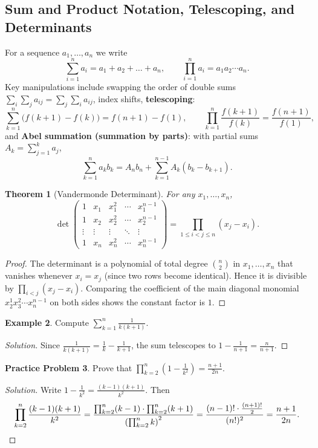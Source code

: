 \documentclass[11pt]{article}
\theoremstyle{plain}
\newtheorem{theorem}{Theorem}[section]
\theoremstyle{definition}
\newtheorem{example}[theorem]{Example}
\newtheorem{problem}[theorem]{Practice Problem}
\newenvironment{solution}{\begin{proof}[Solution]}{\end{proof}}
\begin{document}
\subsection{Sum and Product Notation, Telescoping, and Determinants}
For a sequence $a_1,\dots,a_n$ we write
\[
\sum_{i=1}^n a_i = a_1 + a_2 + \dots + a_n, \qquad
\prod_{i=1}^n a_i = a_1 a_2 \cdots a_n.
\]
Key manipulations include swapping the order of double sums
$\sum_i \sum_j a_{ij} = \sum_j \sum_i a_{ij}$,
index shifts, \textbf{telescoping}:
\[
\sum_{k=1}^n \bigl(f(k+1)-f(k)\bigr) = f(n+1)-f(1), \qquad
\prod_{k=1}^n \frac{f(k+1)}{f(k)} = \frac{f(n+1)}{f(1)},
\]
and \textbf{Abel summation (summation by parts)}: with partial sums $A_k = \sum_{j=1}^k a_j$,
\[
\sum_{k=1}^n a_k b_k = A_n b_n + \sum_{k=1}^{n-1} A_k (b_k - b_{k+1}).
\]

\begin{theorem}[Vandermonde Determinant]
For any $x_1, \dots, x_n$,
\[
\det\begin{pmatrix}
1 & x_1 & x_1^2 & \cdots & x_1^{n-1}\\
1 & x_2 & x_2^2 & \cdots & x_2^{n-1}\\
\vdots & \vdots & \vdots & \ddots & \vdots\\
1 & x_n & x_n^2 & \cdots & x_n^{n-1}
\end{pmatrix} = \prod_{1 \le i < j \le n} (x_j - x_i).
\]
\end{theorem}
\begin{proof}
The determinant is a polynomial of total degree $\binom{n}{2}$ in $x_1,\dots,x_n$ that vanishes whenever $x_i = x_j$ (since two rows become identical). Hence it is divisible by $\prod_{i<j}(x_j - x_i)$. Comparing the coefficient of the main diagonal monomial $x_2^1 x_3^2 \cdots x_n^{n-1}$ on both sides shows the constant factor is $1$.
\end{proof}

\begin{example}
Compute $\displaystyle\sum_{k=1}^{n} \frac{1}{k(k+1)}$.
\end{example}
\begin{solution}
Since $\frac{1}{k(k+1)} = \frac1k - \frac1{k+1}$, the sum telescopes to
$1 - \frac{1}{n+1} = \frac{n}{n+1}$.
\end{solution}

\begin{problem}
Prove that $\displaystyle\prod_{k=2}^{n} \left(1 - \frac{1}{k^2}\right) = \frac{n+1}{2n}$.
\end{problem}
\begin{solution}
Write $1-\frac1{k^2} = \frac{(k-1)(k+1)}{k^2}$. Then
\[
\prod_{k=2}^n \frac{(k-1)(k+1)}{k^2}
= \frac{\prod_{k=2}^n (k-1) \cdot \prod_{k=2}^n (k+1)}{\left(\prod_{k=2}^n k\right)^2}
= \frac{(n-1)! \cdot \frac{(n+1)!}{2}}{(n!)^2}
= \frac{n+1}{2n}. \qedhere
\]
\end{solution}
\end{document}
